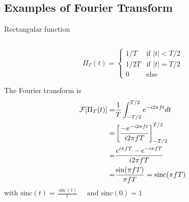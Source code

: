   \subsection{Examples of Fourier Transform}
  \label{sec:}
  \begin{exampleblock}{Rectangular function}
      \begin{columns}
          \begin{column}%
     \begin{equation}
      \label{eq:echelon}
      \Pi_T(t)=
      \begin{cases}
        1/T& \text{if } |t|< T/2\\
        1/2T& \text{if }  |t|= T/2\\
        0& \text{else}
      \end{cases}
    \end{equation}
    
      The Fourier transform is
      \begin{align*}
        \mathcal{F}[\Pi_T(t)]=&   \frac{1}{T}\int_{-T/2}^{T/2} e^{- i 2 \pi f t} d t \\
        =& \left[\frac{-e^{- i 2 \pi f t}}{i 2 \pi fT}\right]_{-T/2}^{T/2}\\
        =&  \frac{e^{i \pi f T}-e^{- i \pi f T}}{i 2 \pi fT}\\
        =& {\frac{\sin(\pi f T)}{\pi f T} = \text{sinc}(\pi f T)}
      \end{align*} 
    with 
    $\text{sinc}(t)= \frac{\sin(t)}{t}\quad\text{ and } \text{sinc}(0)=1$


\end{column}
\end{columns}
\end{exampleblock}
